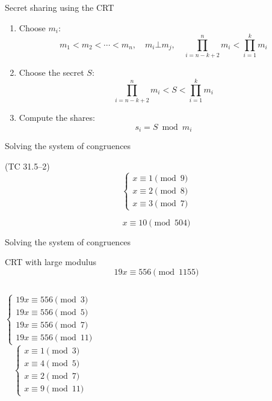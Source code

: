 \begin{frame}{Secret sharing using the CRT}
  \begin{enumerate}[<+->]
	\item Choose $m_i$:
	  \[
		m_1 < m_2 < \cdots < m_n, \quad m_i \bot m_j, \quad \prod_{i=n-k+2}^{n} m_i < \prod_{i=1}^{k} m_i
	  \]
	\item Choose the secret $S$:
	  \[
		\prod_{i=n-k+2}^{n} m_i < S < \prod_{i=1}^{k} m_i
	  \]
	\item Compute the shares:
	  \[
		s_i = S \bmod m_i
	  \]
  \end{enumerate}
\end{frame}
\begin{frame}{Solving the system of congruences}
  \begin{exampleblock}{(TC 31.5--2)}
	\[
	  \begin{cases}
		x \equiv 1 \pmod{9} \\
		x \equiv 2 \pmod{8} \\
		x \equiv 3 \pmod{7}
	  \end{cases}
	\]
  \end{exampleblock}

  \pause
  \[
	x \equiv 10 \pmod{504}
  \]
\end{frame}
\begin{frame}{Solving the system of congruences}
  \begin{exampleblock}{CRT with large modulus}
	\[
	  19x \equiv 556 \pmod{1155}
	\]
  \end{exampleblock}

  \begin{columns}
	  \pause
	  \[
		\begin{cases}
		  19x \equiv 556 \pmod{3} \\
		  19x \equiv 556 \pmod{5} \\
		  19x \equiv 556 \pmod{7} \\
		  19x \equiv 556 \pmod{11}
		\end{cases}
	  \]
	  \pause
	  \[
		\begin{cases}
		  x \equiv 1 \pmod{3} \\
		  x \equiv 4 \pmod{5} \\
		  x \equiv 2 \pmod{7} \\
		  x \equiv 9 \pmod{11}
		\end{cases}
	  \]
  \end{columns}
\end{frame}
